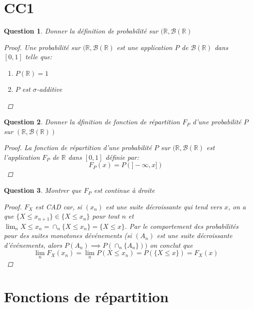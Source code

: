 \documentclass{article}
\theoremstyle{plain}
\newtheorem{question}{Question}
\theoremstyle{definition}
\begin{document}
\section{CC1}
\begin{question}
Donner la définition de probabilité sur $(\mathbb{R}, \mathscr{B} (\mathbb{R})$
\begin{proof}
Une probabilité sur $(\mathbb{R}, \mathscr{B} (\mathbb{R})$ est une application $P$ de $\mathscr{B} (\mathbb{R})$ dans $[0,1]$ telle que:
\begin{enumerate}
	\item $P(\mathbb{R}) = 1$
	\item $P$ est $\sigma$-additive
\end{enumerate}
\end{proof}
\end{question}

\begin{question}
	Donner la dfinition de fonction de répartition $F_P$ d'une probabilité $P$ sur $(\mathbb{R}, \mathscr{B} (\mathbb{R}))$

	\begin{proof}
		La fonction de répartition d'une probabilité $P$ sur $(\mathbb{R}, \mathscr{B} (\mathbb{R})$ est l'application $F_P$ de $\mathbb{R}$ dans $[0,1]$ définie par:
		\begin{equation*}
			F_P(x) = P(]-\infty, x])
		\end{equation*}
	\end{proof}
\end{question}

\begin{question}
	Montrer que $F_P$ est continue à droite
	\begin{proof}
		$F_X$ est CAD car, si $(x_n)$ est une suite décroissante qui tend vers $x$, on a que $\{X \leq
			x_{n+1}\} \in \{X \leq x_n\}$ pour tout $n$ et $\lim_n{X \leq x_n} = \cap_n{\{X \leq x_n\}} = \{{X \leq x\}}$.
		Par le comportement des probabilités pour des suites monotones dévénements
		(si $(A_n)$ est une suite décroissante d’événements, alors $P (A_n) \implies P (\cap_n{\{A_n\}}))$
		on conclut que
		\begin{equation*}
			\lim_n F_X (x_n) = \lim_n{ P (X \leq x_n)} = P (\{X \leq x\}) = F_X (x)
		\end{equation*}
	\end{proof}
\end{question}

\section{Fonctions de répartition}
\end{document}
